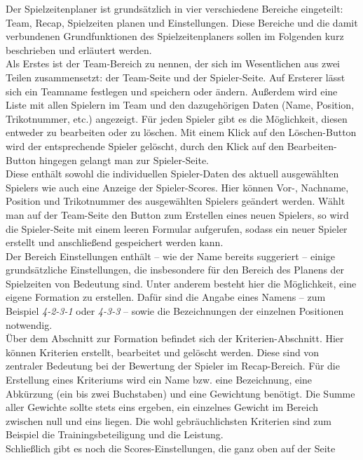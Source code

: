 
Der Spielzeitenplaner ist grundsätzlich in vier verschiedene Bereiche eingeteilt: 
Team, Recap, Spielzeiten planen und Einstellungen. Diese Bereiche und die damit 
verbundenen Grundfunktionen des Spielzeitenplaners sollen im Folgenden kurz 
beschrieben und erläutert werden. \\ 
Als Erstes ist der Team-Bereich zu nennen, der sich im Wesentlichen aus zwei Teilen 
zusammensetzt: der Team-Seite und der Spieler-Seite. Auf Ersterer lässt sich ein 
Teamname festlegen und speichern oder ändern. Außerdem wird eine Liste mit allen 
Spielern im Team und den dazugehörigen Daten (Name, Position, Trikotnummer, etc.) 
angezeigt. Für jeden Spieler gibt es die Möglichkeit, diesen entweder zu bearbeiten oder 
zu löschen. Mit einem Klick auf den Löschen-Button wird der entsprechende Spieler 
gelöscht, durch den Klick auf den Bearbeiten-Button hingegen gelangt man zur 
Spieler-Seite. \\ 
Diese enthält sowohl die individuellen Spieler-Daten des aktuell ausgewählten Spielers 
wie auch eine Anzeige der Spieler-Scores. Hier können Vor-, Nachname, Position und 
Trikotnummer des ausgewählten Spielers geändert werden. Wählt man auf der Team-Seite den 
Button zum Erstellen eines neuen Spielers, so wird die Spieler-Seite mit einem leeren 
Formular aufgerufen, sodass ein neuer Spieler erstellt und anschließend gespeichert 
werden kann. \\ 
Der Bereich Einstellungen enthält -- wie der Name bereits suggeriert -- einige 
grundsätzliche Einstellungen, die insbesondere für den Bereich des Planens der 
Spielzeiten von Bedeutung sind. Unter anderem besteht hier die Möglichkeit, eine 
eigene Formation zu erstellen. Dafür sind die Angabe eines Namens -- zum Beispiel 
\textit{4-2-3-1} oder \textit{4-3-3} -- sowie die Bezeichnungen der einzelnen 
Positionen notwendig. \\ 
Über dem Abschnitt zur Formation befindet sich der Kriterien-Abschnitt. Hier können 
Kriterien erstellt, bearbeitet und gelöscht werden. Diese sind von zentraler 
Bedeutung bei der Bewertung der Spieler im Recap-Bereich. Für die Erstellung eines 
Kriteriums wird ein Name bzw. eine Bezeichnung, eine Abkürzung (ein bis zwei 
Buchstaben) und eine Gewichtung benötigt. Die Summe aller Gewichte sollte stets 
eins ergeben, ein einzelnes Gewicht im Bereich zwischen null und eins liegen. 
Die wohl gebräuchlichsten Kriterien sind zum Beispiel die Trainingsbeteiligung und 
die Leistung. \\ 
Schließlich gibt es noch die Scores-Einstellungen, die ganz oben auf der Seite 
